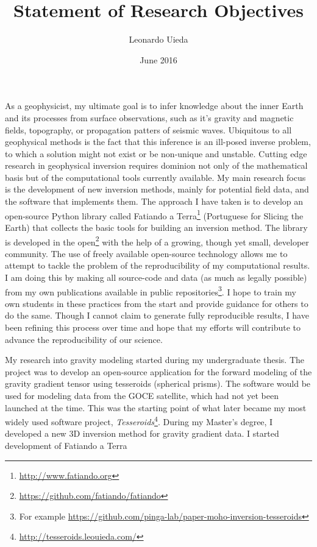 \documentclass[12pt]{article}
\title{\textbf{Statement of Research Objectives}}
\author{Leonardo Uieda}
\date{June 2016}
\begin{document}
\maketitle


As a geophysicist,
my ultimate goal is
to infer knowledge about the inner Earth
and its processes
from surface observations,
such as it's gravity and magnetic fields,
topography,
or propagation patters of seismic waves.
%
Ubiquitous to all geophysical methods is
the fact that this inference is
an ill-posed inverse problem,
to which a solution might not exist or be non-unique and unstable.
%
Cutting edge research
in geophysical inversion
requires dominion not only of the mathematical basis
but of the computational tools currently available.
%
My main research focus is
the development of new inversion methods,
mainly for potential field data,
and the software that implements them.
%
The approach I have taken is
to develop an open-source Python library
called Fatiando a Terra\footnote{\url{http://www.fatiando.org}}
(Portuguese for Slicing the Earth)
that collects the basic tools
for building an inversion method.
%
The library is developed in the
open\footnote{\url{https://github.com/fatiando/fatiando}}
with the help of a growing, though yet small,
developer community.
%
The use of freely available open-source technology
allows me to attempt to tackle
the problem of the reproducibility of my computational results.
%
I am doing this by
making all source-code and data (as much as legally possible)
from my own publications
available in public
repositories\footnote{For example
\url{https://github.com/pinga-lab/paper-moho-inversion-tesseroids}}.
%
I hope to train my own students
in these practices from the start
and provide guidance for others to do the same.
%
Though I cannot claim
to generate fully reproducible results,
I have been refining this process over time
and hope that my efforts will contribute
to advance the reproducibility of our science.



My research into gravity modeling
started during my undergraduate thesis.
%
The project was to develop an open-source application
for the forward modeling of the gravity gradient tensor
using tesseroids (spherical prisms).
%
The software would be used
for modeling data from the GOCE satellite,
which had not yet been launched at the time.
%
This was the starting point
of what later became
my most widely used software project,
\textit{Tesseroids}\footnote{\url{http://tesseroids.leouieda.com/}}.
%
During my Master's degree,
I developed a new 3D inversion method
for gravity gradient data.
I started development of Fatiando a Terra


\end{document}
